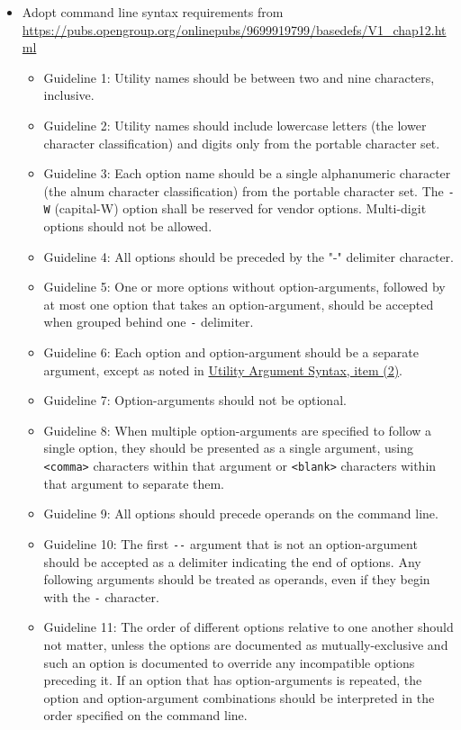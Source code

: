 \documentclass[]{nlr}
\begin{document}
\begin{itemize}
\item Adopt command line syntax requirements from \url{https://pubs.opengroup.org/onlinepubs/9699919799/basedefs/V1\_chap12.html}
\begin{itemize}
\item Guideline 1: Utility names should be between two and nine characters, inclusive.
\item Guideline 2: Utility names should include lowercase letters (the lower character classification) and digits only from the portable character set.
\item Guideline 3: Each option name should be a single alphanumeric character (the alnum character classification) from the portable character set. The \lstinline{-W} (capital-W) option shall be reserved for vendor options. Multi-digit options should not be allowed.
\item Guideline 4: All options should be preceded by the "-" delimiter character.
\item Guideline 5: One or more options without option-arguments, followed by at most one option that takes an option-argument, should be accepted when grouped behind one \lstinline{-} delimiter.
\item Guideline 6: Each option and option-argument should be a separate argument, except as noted in \href{https://pubs.opengroup.org/onlinepubs/9699919799/basedefs/V1\_chap12.html}{Utility Argument Syntax, item (2)}.
\item Guideline 7: Option-arguments should not be optional.
\item Guideline 8: When multiple option-arguments are specified to follow a single option, they should be presented as a single argument, using \lstinline{<comma>} characters within that argument or \lstinline{<blank>} characters within that argument to separate them.
\item Guideline 9: All options should precede operands on the command line.
\item Guideline 10: The first \lstinline{--} argument that is not an option-argument should be accepted as a delimiter indicating the end of options. Any following arguments should be treated as operands, even if they begin with the \lstinline{-} character.
\item Guideline 11: The order of different options relative to one another should not matter, unless the options are documented as mutually-exclusive and such an option is documented to override any incompatible options preceding it. If an option that has option-arguments is repeated, the option and option-argument combinations should be interpreted in the order specified on the command line.

\end{itemize}
\end{itemize}
\end{document}
